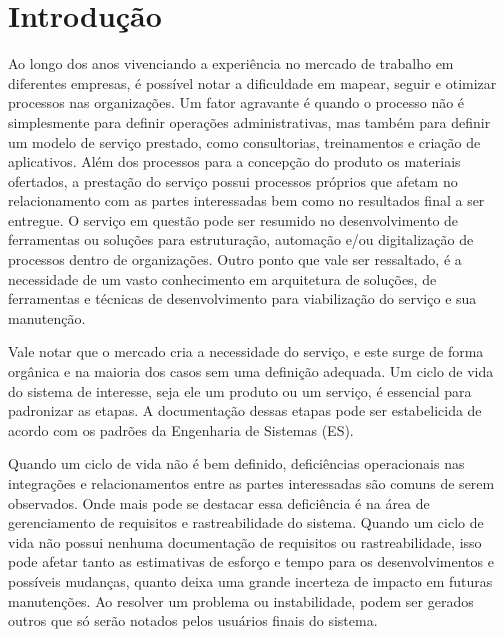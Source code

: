 
\chapter{Introdução}\label{chap:introducao} %

	Ao longo dos anos vivenciando a experiência no mercado de trabalho em diferentes 
	empresas, é possível notar a dificuldade em mapear, seguir e otimizar processos 
	nas organizações. Um fator agravante é quando o processo não é simplesmente 
	para definir operações administrativas, mas também para definir um modelo de 
	serviço prestado,{\color{blue} como consultorias, treinamentos e criação de aplicativos. Além 
	dos processos para a concepção do produto os materiais ofertados, a prestação do 
	serviço possui processos próprios que afetam no relacionamento com as partes interessadas
	bem como no resultados final a ser entregue.} O serviço em questão pode ser resumido no desenvolvimento de 
	ferramentas ou soluções para estruturação, automação e/ou digitalização de processos dentro 
	de organizações. Outro ponto que vale ser ressaltado, é a necessidade de um vasto conhecimento 
	em arquitetura de soluções, de ferramentas e técnicas de desenvolvimento para 
	viabilização do serviço e sua manutenção.

	Vale notar que o mercado cria a necessidade do serviço, e este 
	surge de forma orgânica e na maioria dos casos sem uma definição adequada. Um ciclo 
	de vida do sistema de interesse, seja ele um produto ou um serviço, é essencial para 
	padronizar as etapas. A documentação dessas etapas pode ser estabelicida de acordo com 
	os padrões da Engenharia de Sistemas (ES). 
	
	Quando um ciclo de vida não é bem definido, deficiências operacionais nas integrações 
	e relacionamentos entre as partes interessadas são comuns de serem observados. 
	Onde mais pode se destacar essa deficiência é na área de gerenciamento de requisitos e 
	rastreabilidade do sistema. Quando um ciclo de vida não possui nenhuma documentação de 
	requisitos ou rastreabilidade, isso pode afetar tanto as estimativas de esforço e tempo 
	para os desenvolvimentos e possíveis mudanças, quanto deixa uma grande incerteza de impacto 
	em futuras manutenções. Ao resolver um problema ou instabilidade, podem ser gerados outros 
	que só serão notados pelos usuários finais do sistema.
	
